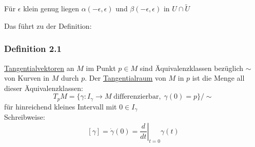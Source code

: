 \documentclass[fleqn, 12pt, letterpaper]{article}
\newcommand{\txt}[1]{\text{#1}}
\begin{document}
Für $\epsilon$ klein genug liegen $\alpha(-\epsilon, \epsilon)$ und $\beta(-\epsilon, \epsilon)$ in $U\cap \tilde{U}$

Das führt zu der Definition:


\subsubsection*{Definition 2.1}
\underline{Tangentialvektoren} an $M$ im Punkt $p \in M$ sind Äquivalenzklassen bezüglich $\sim$ von Kurven in $M$ durch $p$. Der \underline{Tangentialraum} von $M$ in $p$ ist die Menge all dieser Äquivalenzklassen:
\[
T_p M = \{\gamma :I_{\gamma}\rightarrow M \;\txt{differenzierbar},\;\gamma(0)=p\}/\sim
\]
für hinreichend kleines Intervall mit $0 \in I_\gamma$\\
Schreibweise:
\[
[\gamma] = \dot{\gamma}(0) = \left. \frac{d}{dt} \right|_{t=0} \gamma(t)
\]
\end{document}
